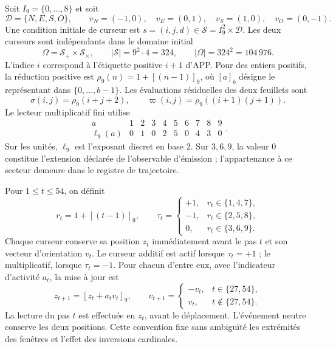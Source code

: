 Soit $I_9=\{0,\ldots,8\}$ et soit
\[
 \mathcal D=\{N,E,S,O\},\qquad
 v_N=(-1,0),\quad v_E=(0,1),\quad
 v_S=(1,0),\quad v_O=(0,-1).
\]
Une condition initiale de curseur est $s=(i,j,d)\in
\mathcal S=I_9^2\times\mathcal D$. Les deux curseurs sont indépendants
dans le domaine initial
\begin{equation}
 \Omega=\mathcal S_+\times\mathcal S_\times,
 \qquad |\mathcal S|=9^2\cdot4=324,
 \qquad |\Omega|=324^2=104\,976.
 \label{iii:nf-dominio}
\end{equation}
L’indice $i$ correspond à l’étiquette positive $i+1$ d’APP. Pour
des entiers positifs, la réduction positive est $\rho_9(n)=1+[(n-1)]_9$,
où $[a]_b$ désigne le représentant dans $\{0,\ldots,b-1\}$.
Les évaluations résiduelles des deux feuillets sont
\[
 \sigma(i,j)=\rho_9(i+j+2),\qquad
 \varpi(i,j)=\rho_9((i+1)(j+1)).
\]
Le lecteur multiplicatif fini utilise
\begin{equation}
 \begin{array}{c|rrrrrrrrr}
 a&1&2&3&4&5&6&7&8&9\\ \hline
 \ell_9(a)&0&1&0&2&5&0&4&3&0
 \end{array}.
 \label{iii:nf-log}
\end{equation}
Sur les unités, $\ell_9$ est l’exposant discret en base $2$.
Sur $3,6,9$, la valeur $0$ constitue l’extension déclarée de
l’observable d’émission ; l’appartenance à ce secteur demeure dans le
registre de trajectoire.

Pour $1\le t\le54$, on définit
\[
 r_t=1+[(t-1)]_9,
 \qquad
 \tau_t=
 \begin{cases}
 +1,&r_t\in\{1,4,7\},\\
 -1,&r_t\in\{2,5,8\},\\
 0,&r_t\in\{3,6,9\}.
 \end{cases}
\]
Chaque curseur conserve sa position $z_t$ immédiatement avant le pas
$t$ et son vecteur d’orientation $v_t$. Le curseur additif est actif
lorsque $\tau_t=+1$ ; le multiplicatif, lorsque $\tau_t=-1$. Pour chacun
d’entre eux, avec l’indicateur d’activité $a_t$, la mise à jour est
\begin{equation}
 z_{t+1}=[z_t+a_tv_t]_9,
 \qquad
 v_{t+1}=
 \begin{cases}
 -v_t,&t\in\{27,54\},\\
 v_t,&t\notin\{27,54\}.
 \end{cases}
 \label{iii:nf-actualizacion}
\end{equation}
La lecture du pas $t$ est effectuée en $z_t$, avant le déplacement.
L’événement neutre conserve les deux positions. Cette convention fixe
sans ambiguïté les extrémités des fenêtres et l’effet des
inversions cardinales.

